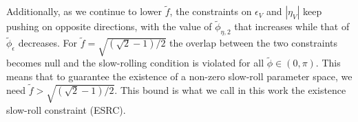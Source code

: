 \begin{subappendices}
Additionally, as we continue to lower $\tilde{f}$, the constraints on $\epsilon_V$ and $|\eta_V|$ keep pushing on opposite directions, with the value of $\tilde{\phi}_{\eta,2}$ that increases while that of $\tilde{\phi}_{\epsilon}$ decreases. For $\tilde{f}=\sqrt{(\sqrt{2}-1)/2}$ the overlap between the two constraints becomes null and the slow-rolling condition is violated for all $\tilde{\phi}\in(0,\pi)$. This means that to guarantee the existence of a non-zero slow-roll parameter space, we need $\tilde{f}>\sqrt{(\sqrt{2}-1)/2}$. This bound is what we call in this work the existence slow-roll constraint (ESRC).

\end{subappendices}

